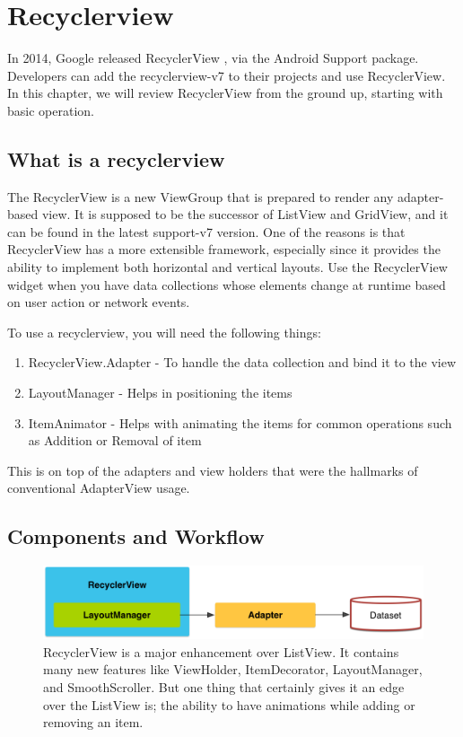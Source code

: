 \chapter{Recyclerview}
In 2014, Google released RecyclerView , via the Android Support package.
Developers can add the recyclerview-v7 to their projects and use RecyclerView. In this chapter, we will review RecyclerView from the ground up, starting with basic
operation.

\section{What is a recyclerview}
The RecyclerView is a new ViewGroup that is prepared to render any adapter-based view. It is supposed to be the successor of ListView and GridView, and it can be found in the latest support-v7 version. One of the reasons is that RecyclerView has a more extensible framework, especially since it provides the ability to implement both horizontal and vertical layouts. Use the RecyclerView widget when you have data collections whose elements change at runtime based on user action or network events.

To use a recyclerview, you will need the following things:
\begin{enumerate}
	\item RecyclerView.Adapter - To handle the data collection and bind it to the view
	\item LayoutManager - Helps in positioning the items
	\item ItemAnimator - Helps with animating the items for common operations such as Addition or Removal of item
\end{enumerate}
This is on top of the adapters and view holders that were the hallmarks of
conventional AdapterView usage.

\section{Components and Workflow}

\begin{figure}
	\includegraphics[width=\textwidth]{images/recycler/components.png}
	\caption{ RecyclerView is a major enhancement over ListView. It contains many new features like ViewHolder, ItemDecorator, LayoutManager, and SmoothScroller. But one thing that certainly gives it an edge over the ListView is; the ability to have animations while adding or removing an item. }
	\label{fig:recyclercomponents}
\end{figure}


